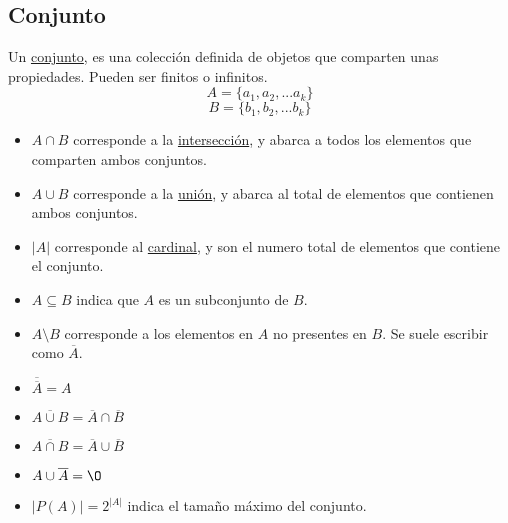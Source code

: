 \subsection{Conjunto}
\noindent Un \underline{conjunto}, es una colección definida de objetos que comparten unas propiedades. Pueden ser finitos o infinitos.
\[
        A = \{a_1,a_2,... a_k\}
\]
\[
        B = \{b_1,b_2,... b_k\}
\]
\noindent{} \par
\begin{itemize}
        \item \(A\cap B\) corresponde a la \underline{intersección}, y abarca a todos los elementos que comparten ambos conjuntos.
        \item \(A\cup B\) corresponde a la \underline{unión}, y abarca al total de elementos que contienen ambos conjuntos.
        \item \(\left | A \right |\) corresponde al \underline{cardinal}, y son el numero total de elementos que contiene el conjunto.
        \item \(A \subseteq  B\) indica que \(A\) es un subconjunto de \(B\).
        \item \(A\setminus B\) corresponde a los elementos en \(A\) no presentes en \(B\). Se suele escribir como \(\overline{A}\).
        \item \(\overline{\overline{A}} = A\)
        \item \(\overline{A\cup B} = \overline{A}\cap \overline{B}\)
        \item \(\overline{A\cap B} = \overline{A}\cup  \overline{B}\)
        \item \(A \cup \overline{A} = \O\)
        \item \(\left | P(A) \right | = 2^{\left | A \right |}\) indica el tamaño máximo del conjunto.
\end{itemize}
\noindent{} \par
\vspace{1cm}
